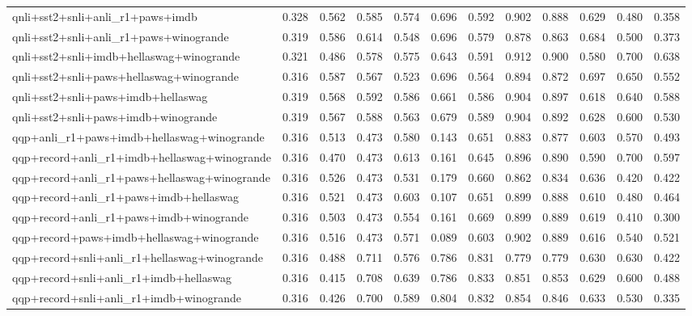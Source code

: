 \begin{table}[t]
\begin{tabular}{lrrrrrrrrrrr}
    qnli+sst2+snli+anli\_r1+paws+imdb & 0.328 & 0.562 & 0.585 & 0.574 & 0.696 & 0.592 & 0.902 & 0.888 & 0.629 & 0.480 & 0.358 \\
    qnli+sst2+snli+anli\_r1+paws+winogrande & 0.319 & 0.586 & 0.614 & 0.548 & 0.696 & 0.579 & 0.878 & 0.863 & 0.684 & 0.500 & 0.373 \\
    qnli+sst2+snli+imdb+hellaswag+winogrande & 0.321 & 0.486 & 0.578 & 0.575 & 0.643 & 0.591 & 0.912 & 0.900 & 0.580 & 0.700 & 0.638 \\
    qnli+sst2+snli+paws+hellaswag+winogrande & 0.316 & 0.587 & 0.567 & 0.523 & 0.696 & 0.564 & 0.894 & 0.872 & 0.697 & 0.650 & 0.552 \\
    qnli+sst2+snli+paws+imdb+hellaswag & 0.319 & 0.568 & 0.592 & 0.586 & 0.661 & 0.586 & 0.904 & 0.897 & 0.618 & 0.640 & 0.588 \\
    qnli+sst2+snli+paws+imdb+winogrande & 0.319 & 0.567 & 0.588 & 0.563 & 0.679 & 0.589 & 0.904 & 0.892 & 0.628 & 0.600 & 0.530 \\
    qqp+anli\_r1+paws+imdb+hellaswag+winogrande & 0.316 & 0.513 & 0.473 & 0.580 & 0.143 & 0.651 & 0.883 & 0.877 & 0.603 & 0.570 & 0.493 \\
    qqp+record+anli\_r1+imdb+hellaswag+winogrande & 0.316 & 0.470 & 0.473 & 0.613 & 0.161 & 0.645 & 0.896 & 0.890 & 0.590 & 0.700 & 0.597 \\
    qqp+record+anli\_r1+paws+hellaswag+winogrande & 0.316 & 0.526 & 0.473 & 0.531 & 0.179 & 0.660 & 0.862 & 0.834 & 0.636 & 0.420 & 0.422 \\
    qqp+record+anli\_r1+paws+imdb+hellaswag & 0.316 & 0.521 & 0.473 & 0.603 & 0.107 & 0.651 & 0.899 & 0.888 & 0.610 & 0.480 & 0.464 \\
    qqp+record+anli\_r1+paws+imdb+winogrande & 0.316 & 0.503 & 0.473 & 0.554 & 0.161 & 0.669 & 0.899 & 0.889 & 0.619 & 0.410 & 0.300 \\
    qqp+record+paws+imdb+hellaswag+winogrande & 0.316 & 0.516 & 0.473 & 0.571 & 0.089 & 0.603 & 0.902 & 0.889 & 0.616 & 0.540 & 0.521 \\
    qqp+record+snli+anli\_r1+hellaswag+winogrande & 0.316 & 0.488 & 0.711 & 0.576 & 0.786 & 0.831 & 0.779 & 0.779 & 0.630 & 0.630 & 0.422 \\
    qqp+record+snli+anli\_r1+imdb+hellaswag & 0.316 & 0.415 & 0.708 & 0.639 & 0.786 & 0.833 & 0.851 & 0.853 & 0.629 & 0.600 & 0.488 \\
    qqp+record+snli+anli\_r1+imdb+winogrande & 0.316 & 0.426 & 0.700 & 0.589 & 0.804 & 0.832 & 0.854 & 0.846 & 0.633 & 0.530 & 0.335 \\

\end{tabular}
\end{table}
